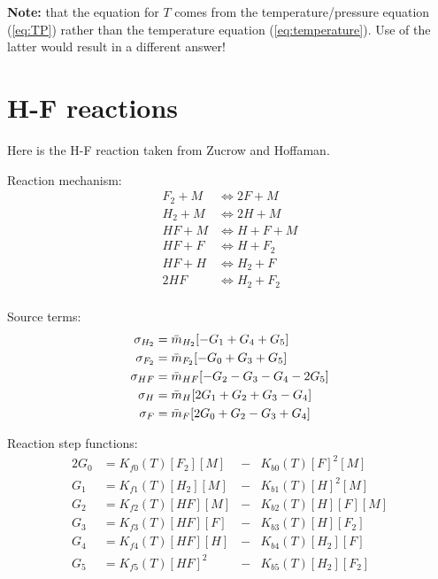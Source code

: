 \documentclass[10pt]{article}
\begin{document}
{\bf Note:} that the equation for $T$ comes from the temperature/pressure equation (\ref{eq:TP})  rather than
the temperature equation (\ref{eq:temperature}). Use of the latter would result in
a different answer! 



\section{H-F reactions}

Here is the H-F reaction taken from Zucrow and Hoffaman.

Reaction mechanism:
\begin{align*}
  F_2 + M & \Leftrightarrow 2 F + M \\
  H_2 + M & \Leftrightarrow 2H + M   \\
  HF + M & \Leftrightarrow H + F + M \\
  HF + F & \Leftrightarrow H + F_2   \\
  HF + H & \Leftrightarrow H_2 + F   \\
 2HF     & \Leftrightarrow H_2 + F_2 \\
\end{align*}

Source terms:
\begin{align*}
   \sigma_{H_2} &= \bar{m}_{H_2} [ -G_1 + G_4 + G_5 ] \\
   \sigma_{F_2} &= \bar{m}_{F_2} [ -G_0 + G_3 + G_5 ] \\
   \sigma_{HF}  &= \bar{m}_{HF}  [ -G_2 -G_3-G_4-2G_5 ] \\
   \sigma_{H}   &= \bar{m}_{H}   [ 2G_1+G_2+G_3-G_4 ] \\
   \sigma_{F}   &= \bar{m}_{F}   [ 2G_0 + G_2 - G_3 + G_4 ] 
\end{align*}

Reaction step functions:
\begin{alignat*}{2}
  G_0 & = K_{f0}(T) [F_2] [M] &-& K_{b0}(T) [F]^2 [M] \\
  G_1 & = K_{f1}(T) [H_2] [M] &-& K_{b1}(T) [H]^2 [M] \\
  G_2 & = K_{f2}(T) [HF]  [M] &-& K_{b2}(T) [H][F][M] \\
  G_3 & = K_{f3}(T) [HF]  [F] &-& K_{b3}(T) [H] [F_2] \\
  G_4 & = K_{f4}(T) [HF]  [H] &-& K_{b4}(T) [H_2] [F] \\
  G_5 & = K_{f5}(T) [HF]^2    &-& K_{b5}(T) [H_2][F_2] 
\end{alignat*}
\end{document}
